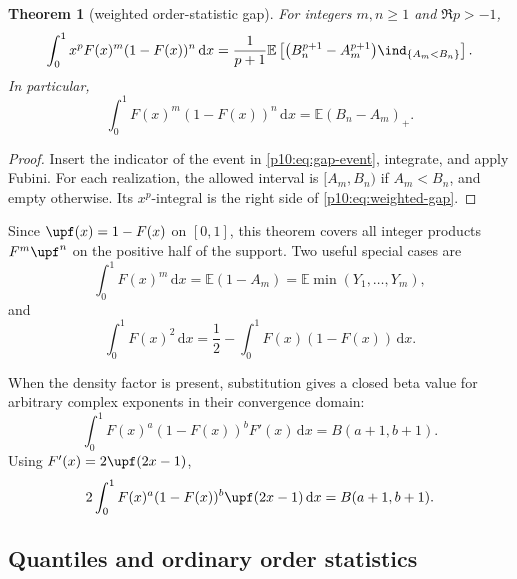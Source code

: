 \documentclass[11pt,oneside]{article}
\newtheorem{theorem}{Theorem}[section]
\theoremstyle{definition}
\theoremstyle{remark}
\newcommand{\F}{F}
\newcommand{\E}{\mathbb E}
\newcommand{\dd}{\,\mathrm d}
\newcommand{\1}{\mathbf 1}
\begin{document}
\begin{theorem}[weighted order-statistic gap]\label{p10:thm:order-gap}
For integers \(m,n\ge1\) and \(\Re p>-1\),
\begin{equation}\label{p10:eq:weighted-gap}
 \int_0^1x^p\F(x)^m(1-\F(x))^n\dd x
 =\frac1{p+1}\E\left[
 \bigl(B_n^{p+1}-A_m^{p+1}\bigr)\ind_{\{A_m<B_n\}}
 \right].
\end{equation}
In particular,
\begin{equation}\label{p10:eq:gap-unweighted}
 \int_0^1\F(x)^m(1-\F(x))^n\dd x
 =\E(B_n-A_m)_+.
\end{equation}
\end{theorem}

\begin{proof}
Insert the indicator of the event in \cref{p10:eq:gap-event}, integrate, and apply Fubini.
For each realization, the allowed interval is \([A_m,B_n)\) if \(A_m<B_n\), and empty
otherwise.  Its \(x^p\)-integral is the right side of \cref{p10:eq:weighted-gap}.
\end{proof}

Since \(\upf(x)=1-\F(x)\) on \([0,1]\), this theorem covers all integer products
\(\F^m\upf^n\) on the positive half of the support.  Two useful special cases are
\begin{equation}\label{p10:eq:Fm-order}
 \int_0^1\F(x)^m\dd x=\E(1-A_m)=\E\min(Y_1,\ldots,Y_m),
\end{equation}
and
\begin{equation}\label{p10:eq:F2-gini-relation}
 \int_0^1\F(x)^2\dd x
 =\frac12-\int_0^1\F(x)(1-\F(x))\dd x.
\end{equation}

When the density factor is present, substitution gives a closed beta value for arbitrary
complex exponents in their convergence domain:
\begin{equation}\label{p10:eq:density-beta}
 \int_0^1\F(x)^a(1-\F(x))^b\F'(x)\dd x
 =B(a+1,b+1).
\end{equation}
Using \(\F'(x)=2\upf(2x-1)\),
\begin{equation}\label{p10:eq:up-density-beta}
 2\int_0^1\F(x)^a(1-\F(x))^b\upf(2x-1)\dd x
 =B(a+1,b+1).
\end{equation}

\subsection{Quantiles and ordinary order statistics}
\end{document}
